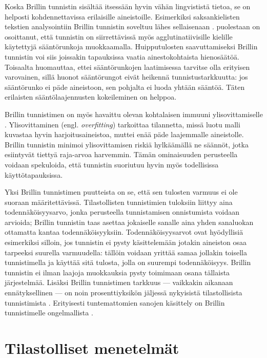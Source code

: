 \documentclass[utf8,bachelor,manualbib]{gradu3}
\begin{document}
Koska Brillin tunnistin sisältää itsessään hyvin vähän lingvististä tietoa, se on helposti kohdennettavissa erilaisille aineistoille. Esimerkiksi saksankielisten tekstien analysointiin Brillin tunnistin soveltuu lähes sellaisenaan \citep{volk1998}. \citet{megyesi1999} puolestaan on osoittanut, että tunnistin on siirrettävissä myös agglutinatiivisille kielille käytettyjä sääntörunkoja muokkaamalla. Huipputulosten saavuttamiseksi Brillin tunnistin voi siis joissakin tapauksissa vaatia ainestokohtaista hienosäätöä. Toisaalta \citet{brill1992} huomauttaa, ettei sääntörunkojen laatimisessa tarvitse olla erityisen varovainen, sillä huonot sääntörungot eivät heikennä tunnistustarkkuutta: jos sääntörunko ei päde aineistoon, sen pohjalta ei luoda yhtään sääntöä. Täten erilaisten sääntölaajennusten kokeileminen on helppoa.

Brillin tunnistimen on myös havaittu olevan kohtalaisen immuuni ylisovittamiselle \citep{ramshaw1994}. Ylisovittaminen (engl. \textit{overfitting}) tarkoittaa tilannetta, missä luotu malli kuvastaa hyvin harjoitusaineistoa, muttei enää päde laajemmalle aineistolle. Brillin tunnistin minimoi ylisovittamisen riskiä hylkäämällä ne säännöt, jotka esiintyvät tiettyä raja-arvoa harvemmin. Tämän ominaisuuden perusteella voidaan spekuloida, että tunnistin suoriutuu hyvin myös todellisissa käyttötapauksissa.

Yksi Brillin tunnistimen puutteista on se, että sen tulosten varmuus ei ole suoraan määritettävissä. Tilastollisten tunnistimien tuloksiin liittyy aina todennäköisyysarvo, jonka perusteella tunnistamisen onnistumista voidaan arvioida; Brillin tunnistin taas asettaa jokaiselle sanalle aina yhden sanaluokan ottamatta kantaa todennäköisyyksiin. Todennäköisyysarvot ovat hyödyllisiä esimerkiksi silloin, jos tunnistin ei pysty käsittelemään jotakin aineiston osaa tarpeeksi suurella varmuudella: tällöin voidaan yrittää samaa jollakin toisella tunnistimella ja käyttää sitä tulosta, jolla on suurempi todennäköisyys. Brillin tunnistin ei ilman laajoja muokkauksia pysty toimimaan osana tällaista järjestelmää. Lisäksi Brillin tunnistimen tarkkuus --- vaikkakin aikanaan ennätyksellinen --- on noin prosenttiyksikön jäljessä nykyisistä tilastollisista tunnistimista \citep{spoustova2009, sogaard2011}. Erityisesti tuntemattomien sanojen käsittely on Brillin tunnistimelle ongelmallista \citep{schneider1998}.

\chapter{Tilastolliset menetelmät}
\end{document}
